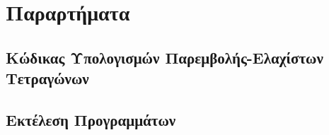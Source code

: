 \documentclass[assignment3.tex]{subfiles}
\begin{document}
\section*{Παραρτήματα}
\subsection*{Κώδικας Υπολογισμών Παρεμβολής-Ελαχίστων Τετραγώνων}


\subsection*{Εκτέλεση Προγραμμάτων}

\end{document}

